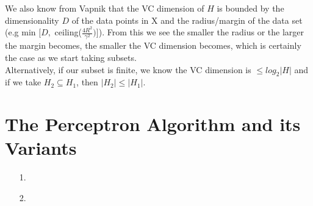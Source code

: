 \documentclass[11pt,a4paper]{article}
\begin{document}
\begin{itemize}
				We also know from Vapnik that the VC dimension of $H$ is bounded by the dimensionality $D$ of the data points in X and the radius/margin of the data set (e.g min $\Big[ D,$ ceiling($\frac{4R^2}{\gamma^2}) \Big]$). From this we see the smaller the radius or the larger the margin becomes, the smaller the VC dimension becomes, which is certainly the case as we start taking subsets.\\
				
				Alternatively, if our subset is finite, we know the VC dimension is $\leq log_2 \vert H \vert$ and if we take $H_2 \subseteq H_1$, then $\vert H_2 \vert \leq \vert H_1 \vert$.
		\end{itemize}
	
	\section{The Perceptron Algorithm and its Variants}
		\begin{itemize}
			\item [1.]				
			\item [2.]
		\end{itemize}
	
\end{document}
